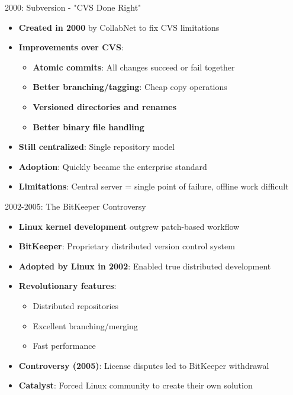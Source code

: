 \documentclass{beamer}
\begin{document}
\begin{frame}[t]{2000: Subversion - "CVS Done Right"}
\begin{itemize}
    \item \textbf{Created in 2000} by CollabNet to fix CVS limitations
    \item \textbf{Improvements over CVS}:
        \begin{itemize}
            \item \textbf{Atomic commits}: All changes succeed or fail together
            \item \textbf{Better branching/tagging}: Cheap copy operations
            \item \textbf{Versioned directories and renames}
            \item \textbf{Better binary file handling}
        \end{itemize}
    \item \textbf{Still centralized}: Single repository model
    \item \textbf{Adoption}: Quickly became the enterprise standard
    \item \textbf{Limitations}: Central server = single point of failure, offline work difficult
\end{itemize}
\end{frame}


\begin{frame}[t]{2002-2005: The BitKeeper Controversy}
        \begin{itemize}
            \item \textbf{Linux kernel development} outgrew patch-based workflow
            \item \textbf{BitKeeper}: Proprietary distributed version control system
            \item \textbf{Adopted by Linux in 2002}: Enabled true distributed development
            \item \textbf{Revolutionary features}:
                \begin{itemize}
                    \item Distributed repositories
                    \item Excellent branching/merging
                    \item Fast performance
                \end{itemize}
            \item \textbf{Controversy (2005)}: License disputes led to BitKeeper withdrawal
            \item \textbf{Catalyst}: Forced Linux community to create their own solution
        \end{itemize}
\end{frame}
\end{document}
